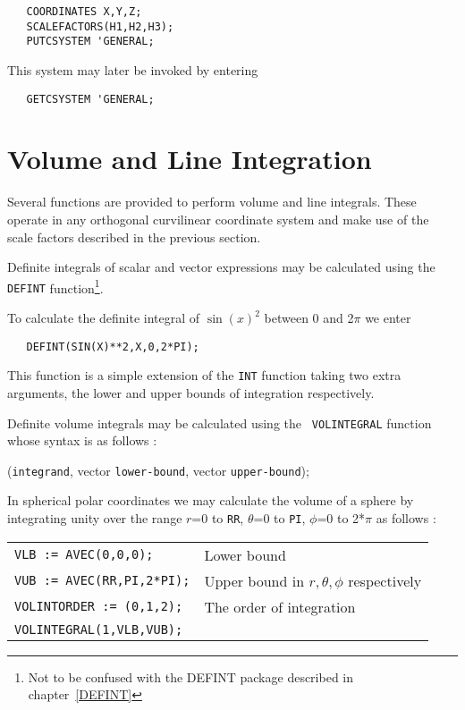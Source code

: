\documentclass[11pt,letterpaper]{book}
\begin{document}
{\small\begin{verbatim}
   COORDINATES X,Y,Z;
   SCALEFACTORS(H1,H2,H3);
   PUTCSYSTEM 'GENERAL;
\end{verbatim}}

This system may later be invoked by entering

{\small\begin{verbatim}
   GETCSYSTEM 'GENERAL;
\end{verbatim}}

\section{Volume and Line Integration}

Several functions are provided to perform volume and line integrals.
These operate in any orthogonal curvilinear coordinate system and
make use of the scale factors described in the previous section.

Definite integrals of scalar and vector expressions may be calculated
using the {\tt DEFINT} function\footnote{Not to be confused with the
DEFINT package described in chapter~\ref{DEFINT}}.

\example{}

\noindent To calculate the definite integral of $\sin(x)^2$ between 0 and
2$\pi$ we enter

{\small\begin{verbatim}
   DEFINT(SIN(X)**2,X,0,2*PI);
\end{verbatim}}

This function is a simple extension of the {\tt INT} function taking
two extra arguments, the lower and upper bounds of integration
respectively.

Definite volume integrals may be calculated using the {\tt
VOLINTEGRAL} function whose syntax is as follows :

({\tt integrand}, vector {\tt lower-bound},
vector {\tt upper-bound});

\example{}

\noindent In spherical polar coordinates we may calculate the volume of a
sphere by integrating unity over the range $r$=0 to {\tt RR}, $\theta$=0 to
{\tt PI}, $\phi$=0 to 2*$\pi$ as follows :

\begin{tabular}{l l}
{\tt VLB := AVEC(0,0,0);} & Lower bound \\
{\tt VUB := AVEC(RR,PI,2*PI);} & Upper bound in $r, \theta, \phi$
 respectively \\
{\tt VOLINTORDER := (0,1,2);} & The order of integration \\
{\tt VOLINTEGRAL(1,VLB,VUB);} & \\
\end{tabular}
\end{document}
